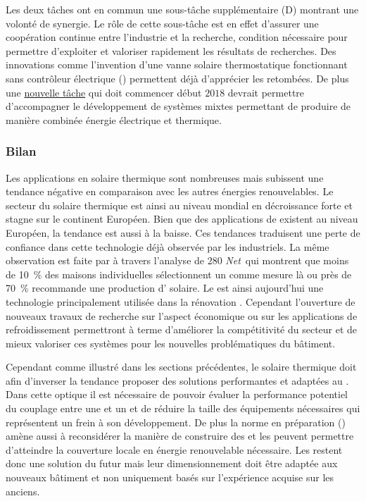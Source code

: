 Les deux tâches ont en commun une sous-tâche supplémentaire (D) montrant une volonté
de synergie. Le rôle de cette sous-tâche est en effet d’assurer une coopération
continue entre l’industrie et la recherche, condition nécessaire
pour permettre d’exploiter et valoriser rapidement les résultats de recherches.
Des innovations comme l’invention d’une vanne solaire thermostatique fonctionnant
sans contrôleur électrique ()
permettent déjà d’apprécier les retombées.
De plus une \href{http://www.iea-shc.org/article?NewsID=173}{nouvelle tâche} qui doit
commencer début $2018$ devrait permettre d’accompagner le développement de systèmes mixtes
permettant de produire de manière combinée énergie électrique et thermique.


\subsubsection{Bilan} %
\label{ssub:bilan_evolution}
Les applications en solaire thermique sont nombreuses mais subissent
une tendance négative en comparaison avec les autres énergies renouvelables. Le
secteur du solaire thermique est ainsi au niveau mondial en décroissance forte et stagne
sur le continent Européen. Bien que des applications de  existent au niveau
Européen, la tendance est aussi à la baisse. Ces tendances traduisent une perte de
confiance dans cette technologie déjà observée par les industriels. La même observation
est faite par \textcite{Musall2010} à travers l’analyse de $280$ \textit{Net}\, qui
montrent que moins de \SI{10}{\percent} des maisons individuelles sélectionnent un 
comme mesure là ou près de \SI{70}{\percent} recommande une production d’
solaire. Le  est ainsi aujourd’hui une technologie principalement utilisée dans la rénovation
\parencite{Ellehauge2003}. Cependant l’ouverture de nouveaux travaux de recherche
sur l’aspect économique ou sur les applications de refroidissement
permettront à terme d’améliorer la compétitivité du secteur et de mieux valoriser ces systèmes pour les nouvelles
problématiques du bâtiment.

Cependant comme illustré dans les sections précédentes, le solaire thermique doit
afin d’inverser la tendance proposer des solutions performantes et adaptées au .
Dans cette optique il est nécessaire de pouvoir évaluer la performance potentiel
du couplage entre une  et un  et de réduire la taille des équipements
nécessaires qui représentent un frein à son développement.
De plus la norme en préparation () amène aussi à reconsidérer la manière
de construire des  et les  peuvent permettre d’atteindre la couverture
locale en énergie renouvelable nécessaire.
Les  restent donc une solution du futur mais leur dimensionnement doit être adaptée
aux nouveaux bâtiment et non uniquement basés sur l’expérience acquise sur les anciens.


